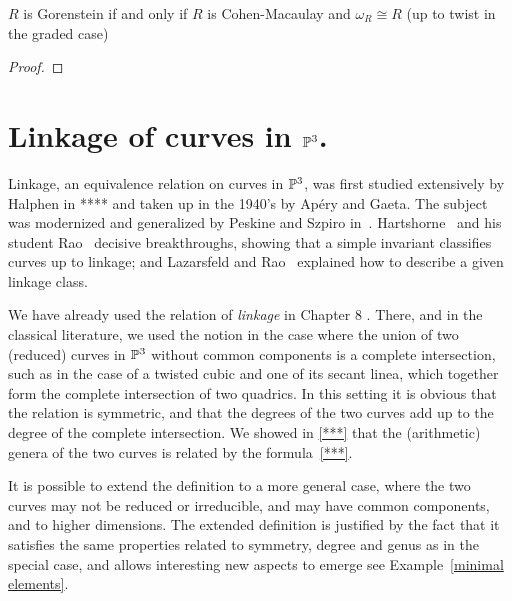 
\begin{theorem} \label{canonical of Gor}
 $R$ is Gorenstein if and only if $R$ is Cohen-Macaulay and $\omega_{R} \cong R$ (up to twist in the graded case)
\end{theorem}
\begin{proof}
 
\end{proof}

\section{Linkage of curves in $\PP^3$.}

Linkage, an equivalence relation on curves in $\PP^3$, was first studied extensively by Halphen in **** and taken up in the 1940's by Ap\'ery and Gaeta. The subject was modernized and generalized by Peskine and Szpiro in~\cite{PeskineSzpiro}. Hartshorne~\cite{} and his student
Rao~\cite{} decisive breakthroughs, showing that a simple invariant classifies curves up to linkage; and Lazarsfeld and Rao~\cite{} explained how to describe a given linkage class.


We have already used the relation of \emph{ linkage} in Chapter 8 . There, and in the classical literature, we used the notion in the case where the union of two (reduced) curves in $\PP^{3}$ without common components is a complete intersection, such as in the case of  a twisted cubic and one of its secant linea, which together form the complete intersection of two quadrics. In this setting it is obvious that the relation is symmetric, and that the degrees of the two curves add up to the degree of the complete intersection. We showed in \ref{***} that the (arithmetic) genera of the two curves is related by the formula~\ref{***}. 

It is possible to extend the definition to a more general case, where the two curves may not be reduced or irreducible, and may have common components, and to higher dimensions. The extended definition is justified by the fact that it satisfies the same properties related to symmetry, degree and genus as in the special case, and allows interesting new aspects to emerge see Example~\ref{minimal elements}. 



